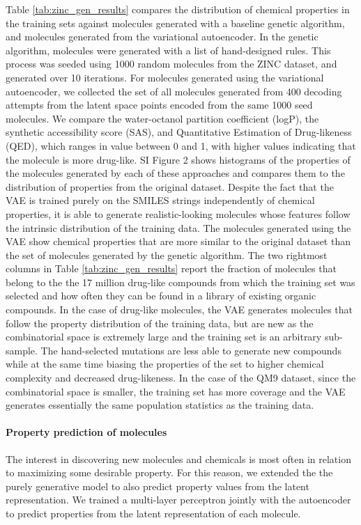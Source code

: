 Table \ref{tab:zinc_gen_results} compares the distribution of chemical properties in the training sets against molecules generated with a baseline genetic algorithm, and molecules generated from the variational autoencoder. In the genetic algorithm, molecules were generated with a list of hand-designed rules\cite{Virshup_2013, Rupakheti_2015, Reymond_2015, Reymond_2010,kanal_2013_efficient,oboyle_2011_computational}. This process was seeded using 1000 random molecules from the ZINC dataset, and generated over 10 iterations. For molecules generated using the variational autoencoder, we collected the set of all molecules generated from 400 decoding attempts from the latent space points encoded from the same 1000 seed molecules.
We compare the water-octanol partition coefficient (logP), the synthetic accessibility score (SAS),\cite{Ertl2009estimation} and Quantitative Estimation of Drug-likeness (QED),\cite{bickerton2012quantifying} which ranges in value between 0 and 1, with higher values indicating that the molecule is more drug-like. SI Figure 2 shows histograms of the properties of the molecules generated by each of these approaches and compares them to the distribution of properties from the original dataset. Despite the fact that the VAE is trained purely on the SMILES strings independently of chemical properties, it is able to generate realistic-looking molecules whose features follow the intrinsic distribution of the training data. The molecules generated using the VAE show chemical properties that are more similar to the original dataset than the set of molecules generated by the genetic algorithm.
The two rightmost columns in Table \ref{tab:zinc_gen_results} report the fraction of molecules that belong to the the 17 million drug-like compounds from which the training set was selected and how often they can be found in a library of existing organic compounds. In the case of drug-like molecules, the VAE generates molecules that follow the property distribution of the training data, but are new as the combinatorial space is extremely large and the training set is an arbitrary sub-sample. The hand-selected mutations are less able to generate new compounds while at the same time biasing the properties of the set to higher chemical complexity and decreased drug-likeness. In the case of the QM9 dataset, since the combinatorial space is smaller, the training set has more coverage and the VAE generates essentially the same population statistics as the training data.

\paragraph{Property prediction of molecules}
The interest in discovering new molecules and chemicals is most often in relation to maximizing some desirable property. For this reason, we extended the the purely generative model to also predict property values from the latent representation. We trained a multi-layer perceptron jointly with the autoencoder to predict properties from the latent representation of each molecule.


